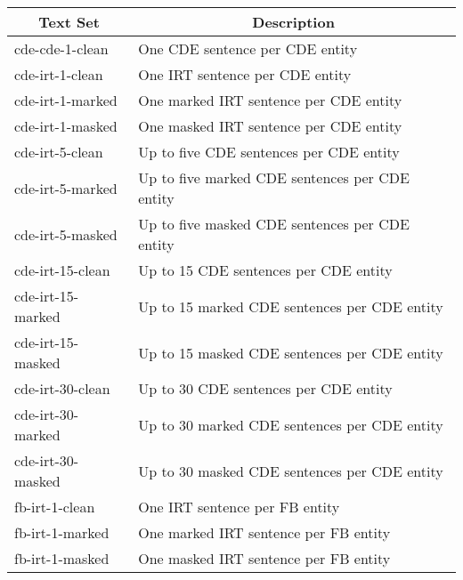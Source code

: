 \begin{tabular}{| l | l |}
    \hline

    \multicolumn{1}{|c|}{\textbf{Text Set}} &
    \multicolumn{1}{|c|}{\textbf{Description}} \\

    \hline \hline

    cde-cde-1-clean   & One CDE sentence per CDE entity                \\

    \hline

    cde-irt-1-clean   & One IRT sentence per CDE entity                \\
    cde-irt-1-marked  & One marked IRT sentence per CDE entity         \\
    cde-irt-1-masked  & One masked IRT sentence per CDE entity         \\

    \hline

    cde-irt-5-clean   & Up to five CDE sentences per CDE entity        \\
    cde-irt-5-marked  & Up to five marked CDE sentences per CDE entity \\
    cde-irt-5-masked  & Up to five masked CDE sentences per CDE entity \\

    \hline

    cde-irt-15-clean  & Up to 15 CDE sentences per CDE entity          \\
    cde-irt-15-marked & Up to 15 marked CDE sentences per CDE entity   \\
    cde-irt-15-masked & Up to 15 masked CDE sentences per CDE entity   \\

    \hline

    cde-irt-30-clean  & Up to 30 CDE sentences per CDE entity          \\
    cde-irt-30-marked & Up to 30 marked CDE sentences per CDE entity   \\
    cde-irt-30-masked & Up to 30 masked CDE sentences per CDE entity   \\

    \hline \hline

    fb-irt-1-clean    & One IRT sentence per FB entity                 \\
    fb-irt-1-marked   & One marked IRT sentence per FB entity          \\
    fb-irt-1-masked   & One masked IRT sentence per FB entity          \\


\end{tabular}
